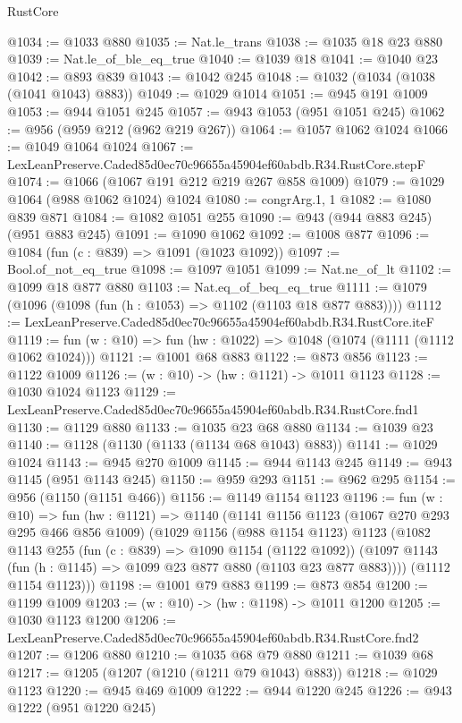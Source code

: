 \begin{lexlean}{RustCore}
\begin{coremodule}
@1034 := @1033 @880
@1035 := Nat.le_trans
@1038 := @1035 @18 @23 @880
@1039 := Nat.le_of_ble_eq_true
@1040 := @1039 @18
@1041 := @1040 @23
@1042 := @893 @839
@1043 := @1042 @245
@1048 := @1032 (@1034 (@1038 (@1041 @1043) @883))
@1049 := @1029 @1014
@1051 := @945 @191 @1009
@1053 := @944 @1051 @245
@1057 := @943 @1053 (@951 @1051 @245)
@1062 := @956 (@959 @212 (@962 @219 @267))
@1064 := @1057 @1062 @1024
@1066 := @1049 @1064 @1024
@1067 := LexLeanPreserve.Caded85d0ec70c96655a45904ef60abdb.R34.RustCore.stepF
@1074 := @1066 (@1067 @191 @212 @219 @267 @858 @1009)
@1079 := @1029 @1064 (@988 @1062 @1024) @1024
@1080 := congrArg.{1, 1}
@1082 := @1080 @839 @871
@1084 := @1082 @1051 @255
@1090 := @943 (@944 @883 @245) (@951 @883 @245)
@1091 := @1090 @1062
@1092 := @1008 @877
@1096 := @1084 (fun (c : @839) => @1091 (@1023 @1092))
@1097 := Bool.of_not_eq_true
@1098 := @1097 @1051
@1099 := Nat.ne_of_lt
@1102 := @1099 @18 @877 @880
@1103 := Nat.eq_of_beq_eq_true
@1111 := @1079 (@1096 (@1098 (fun (h : @1053) => @1102 (@1103 @18 @877 @883))))
@1112 := LexLeanPreserve.Caded85d0ec70c96655a45904ef60abdb.R34.RustCore.iteF
@1119 := fun (w : @10) => fun (hw : @1022) => @1048 (@1074 (@1111 (@1112 @1062 @1024)))
@1121 := @1001 @68 @883
@1122 := @873 @856
@1123 := @1122 @1009
@1126 := (w : @10) -> (hw : @1121) -> @1011 @1123
@1128 := @1030 @1024 @1123
@1129 := LexLeanPreserve.Caded85d0ec70c96655a45904ef60abdb.R34.RustCore.fnd1
@1130 := @1129 @880
@1133 := @1035 @23 @68 @880
@1134 := @1039 @23
@1140 := @1128 (@1130 (@1133 (@1134 @68 @1043) @883))
@1141 := @1029 @1024
@1143 := @945 @270 @1009
@1145 := @944 @1143 @245
@1149 := @943 @1145 (@951 @1143 @245)
@1150 := @959 @293
@1151 := @962 @295
@1154 := @956 (@1150 (@1151 @466))
@1156 := @1149 @1154 @1123
@1196 := fun (w : @10) =>
  fun (hw : @1121) =>
  @1140
    (@1141
      @1156
      @1123
      (@1067 @270 @293 @295 @466 @856 @1009)
      (@1029
        @1156
        (@988 @1154 @1123)
        @1123
        (@1082
          @1143
          @255
          (fun (c : @839) => @1090 @1154 (@1122 @1092))
          (@1097 @1143 (fun (h : @1145) => @1099 @23 @877 @880 (@1103 @23 @877 @883))))
        (@1112 @1154 @1123)))
@1198 := @1001 @79 @883
@1199 := @873 @854
@1200 := @1199 @1009
@1203 := (w : @10) -> (hw : @1198) -> @1011 @1200
@1205 := @1030 @1123 @1200
@1206 := LexLeanPreserve.Caded85d0ec70c96655a45904ef60abdb.R34.RustCore.fnd2
@1207 := @1206 @880
@1210 := @1035 @68 @79 @880
@1211 := @1039 @68
@1217 := @1205 (@1207 (@1210 (@1211 @79 @1043) @883))
@1218 := @1029 @1123
@1220 := @945 @469 @1009
@1222 := @944 @1220 @245
@1226 := @943 @1222 (@951 @1220 @245)

\end{coremodule}
\end{lexlean}
